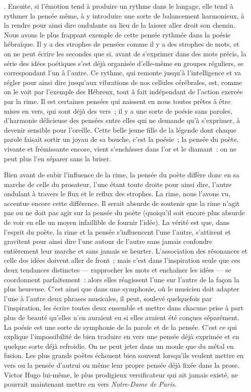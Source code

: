 \documentclass[french,twoside]{book} %
\begin{document}
{}. Ensuite, si l’émotion tend à  produire un rythme dans le langage, elle tend à rythmer la pensée même, à y introduire une sorte de balancement harmonieux, à la rendre pour ainsi dire ondulante au lieu de la laisser aller droit son chemin. Nous avons le plus frappant exemple de cette pensée rythmée dans la poésie hébraïque. Il y a des strophes de pensées comme il y a des strophes de mots, et on ne peut écrire les secondes que si, avant de s’exprimer dans des mots précis, la série des idées poétiques s’est déjà organisée d’elle-même en groupes réguliers, se correspondant l’un à l’autre. Ce rythme, qui remonte jusqu’à l’intelligence et va régler pour ainsi dire jusqu’aux vibrations de nos cellules cérébrales, est, comme on le voit par l’exemple des Hébreux, tout à fait indépendant de l’action exercée par la rime. Il est certaines pensées qui naissent en nous toutes prêtes à être mises en vers,  qui sont déjà des vers ; il y a une sorte de poésie sans paroles, d’harmonie délicieuse des pensées entre elles qui ne demande qu’à s’exprimer, à devenir sensible pour l’oreille. Cette belle jeune fille de la légende dont chaque parole faisait sortir un joyau de sa bouche, c’est la poésie ; la pensée du poète, vivante et frémissante encore, vient s’enchâsser dans l’or et le diamant : on ne peut plus l’en séparer sans la briser.\par
Bien avant de subir l’influence de la rime, la pensée du poète diffère donc en sa marche de celle du prosateur, l’une étant toute droite pour ainsi dire, l’autre ondulant à travers le flux et le reflux des strophes. La rime, nous l’avons vu, accentue encore cette différence. Il serait absurde de soutenir que la rime n’agit pas ou ne doit pas agir sur la pensée du poète (quoiqu’il soit encore plus absurde de voir en elle un moyen infaillible de fournir l’idée). La vérité est que, dans l’esprit du poète, la rime et la pensée s’influencent l’une l’autre, s’attirent et gravitent pour ainsi dire l’une autour de l’autre sans jamais confondre entièrement leur marche et sans jamais se heurter. L’association des résonances et celle des idées doivent aller de front ; mais c’est dans l’inspiration seule que ces deux tendances distinctes — rapprocher les mots et enchaîner les idées — se coordonnent parfaitement : alors elles réagissent l’une sur l’autre de la façon la plus heureuse. C’est ainsi que dans une symphonie, où le musicien doit adapter l’une à l’autre deux phrases musicales, il peut, soulevé quelquefois par l’inspiration, les écrire toutes deux ensemble et mettre dans chacune prise à part plus de  beauté qu’elles n’en auraient eu si elles avaient été conçues séparément. La poésie est une sorte de symphonie de la parole et de la pensée. C’est ce qui explique l’impossibilité de bien traduire en vers une pensée déjà exprimée et en quelque sorte déjà refroidie. On ne peut jeter dans un moule que du métal en fusion. Les plus grands poètes échouent bien souvent lorsqu’ils veulent mettre en vers ou la pensée d’autrui ou même leur propre pensée déjà fixée dans la prose. Victor Hugo lui-même, le plus prodigieux versificateur qui ait jamais existé, ne pourrait maintenant mettre en vers \emph{Notre-Dame de Paris}.\par
\end{document}

